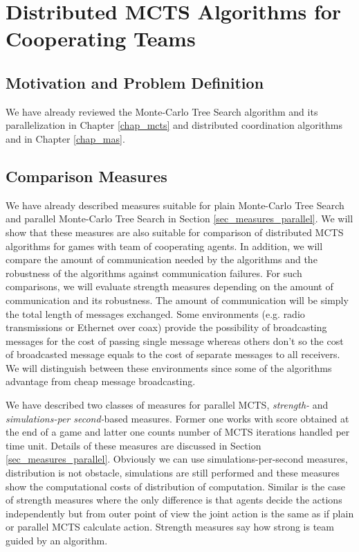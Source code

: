 \chapter{Distributed MCTS Algorithms for Cooperating Teams}
\label{chap_dmcts_design}

\section{Motivation and Problem Definition}


We have already reviewed the Monte-Carlo Tree Search algorithm and its parallelization in
 Chapter \ref{chap_mcts} and distributed coordination algorithms and in Chapter \ref{chap_mas}.




\section{Comparison Measures}
\label{sec_measures_distributed}

We have already described measures suitable for plain Monte-Carlo Tree Search and parallel
Monte-Carlo Tree Search in Section \ref{sec_measures_parallel}. We will show that these
measures are also suitable for comparison of distributed MCTS algorithms for games with team
of cooperating agents. In addition, we will compare the amount of communication needed by the
algorithms and the robustness of the algorithms against communication failures. For such
comparisons, we will evaluate strength measures depending on the amount of communication and
its robustness. The amount of communication will be simply the total length of messages
exchanged. Some environments (e.g. radio transmissions or Ethernet over coax) provide the 
possibility of broadcasting messages for the cost of passing single message whereas others 
don't so the cost of broadcasted message equals to the cost of separate messages to all
receivers. We will distinguish between these
environments since some of the algorithms advantage from cheap message broadcasting.

We have described two classes of measures for parallel MCTS, \emph{strength-} and
\emph{simulations-per second-}based measures. Former one works with score obtained at the end
of a game and latter one counts number of MCTS iterations handled per time unit. Details of
these measures are discussed in Section \ref{sec_measures_parallel}. Obviously we can use
simulations-per-second measures, distribution is not obstacle, simulations are still performed
and these measures show the computational costs of distribution of computation. Similar is the
case of strength measures where the only difference is that agents decide the actions
independently but from outer point of view the joint action is the same as if plain or parallel
MCTS calculate action. Strength measures say how strong is team guided by an algorithm.

